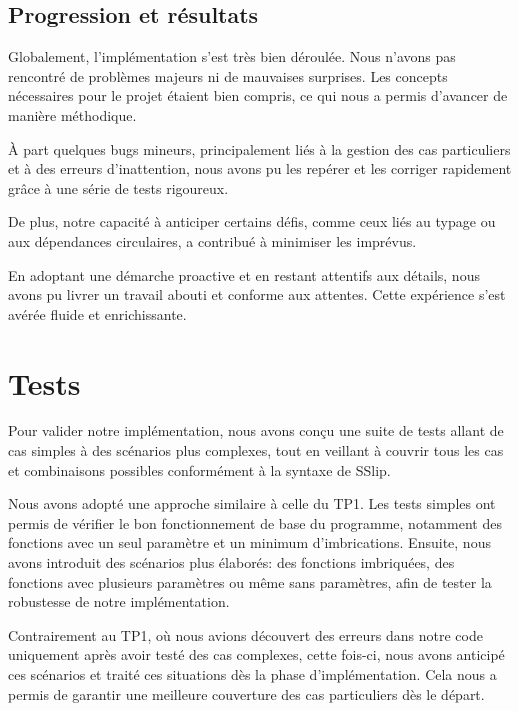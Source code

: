 \documentclass{article}
\begin{document}
\subsection{Progression et résultats}
Globalement, l'implémentation s'est très bien déroulée. Nous n'avons pas rencontré de problèmes majeurs ni de mauvaises surprises. Les concepts nécessaires pour le projet étaient bien compris, ce qui nous a permis d'avancer de manière méthodique.

À part quelques bugs mineurs, principalement liés à la gestion des cas particuliers et à des erreurs d'inattention, nous avons pu les repérer et les corriger rapidement grâce à une série de tests rigoureux. 

De plus, notre capacité à anticiper certains défis, comme ceux liés au typage ou aux dépendances circulaires, a contribué à minimiser les imprévus.

En adoptant une démarche proactive et en restant attentifs aux détails, nous avons pu livrer un travail abouti et conforme aux attentes. Cette expérience s'est avérée fluide et enrichissante.















\section{Tests}
Pour valider notre implémentation, nous avons conçu une suite de tests allant de cas simples à des scénarios plus complexes, tout en veillant à couvrir tous les cas et combinaisons possibles conformément à la syntaxe de SSlip.

Nous avons adopté une approche similaire à celle du TP1. Les tests simples ont permis de vérifier le bon fonctionnement de base du programme, notamment des fonctions avec un seul paramètre et un minimum d’imbrications. Ensuite, nous avons introduit des scénarios plus élaborés: des fonctions imbriquées, des fonctions avec plusieurs paramètres ou même sans paramètres, afin de tester la robustesse de notre implémentation.

Contrairement au TP1, où nous avions découvert des erreurs dans notre code uniquement après avoir testé des cas complexes, cette fois-ci, nous avons anticipé ces scénarios et traité ces situations dès la phase d’implémentation. Cela nous a permis de garantir une meilleure couverture des cas particuliers dès le départ.
\end{document}
